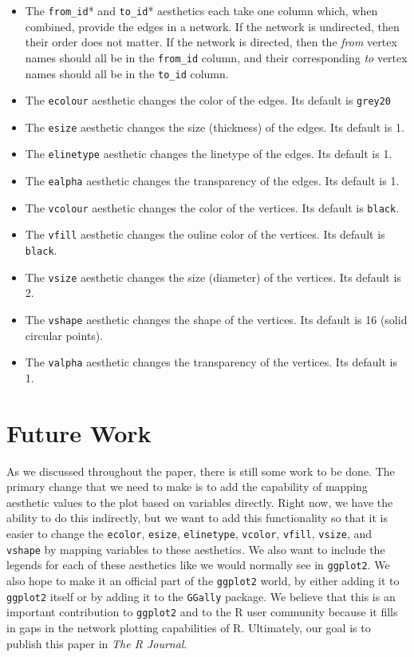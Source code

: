 \documentclass[11pt]{article}\usepackage[]{graphicx}\usepackage[]{color}
\begin{document}
  \begin{itemize}
  \item The \texttt{from\_id}* and \texttt{to\_id}* aesthetics each take one column which, when combined, provide the edges in a network.  If the network is undirected, then their order does not matter. If the network is directed, then the \emph{from} vertex names should all be in the \texttt{from\_id} column, and their corresponding \emph{to} vertex names should all be in the \texttt{to\_id} column.
  \item The \texttt{ecolour} aesthetic changes the color of the edges. Its default is \texttt{grey20}
  \item The \texttt{esize} aesthetic changes the size (thickness) of the edges. Its default is 1.
  \item The \texttt{elinetype} aesthetic changes the linetype of the edges. Its default is 1.
  \item The \texttt{ealpha} aesthetic changes the transparency of the edges. Its default is 1.
  \item The \texttt{vcolour} aesthetic changes the color of the vertices. Its default is \texttt{black}.
  \item The \texttt{vfill} aesthetic changes the ouline color of the vertices. Its default is \texttt{black}.
  \item The \texttt{vsize} aesthetic changes the size (diameter) of the vertices. Its default is 2.
  \item The \texttt{vshape} aesthetic changes the shape of the vertices. Its default is 16 (solid circular points).
  \item The \texttt{valpha} aesthetic changes the transparency of the vertices. Its default is 1.
  \end{itemize}

\section{Future Work}
As we discussed throughout the paper, there is still some work to be done.  The primary change that we need to make is to add the capability of mapping aesthetic values to the plot based on variables directly. Right now, we have the ability to do this indirectly, but we want to add this functionality so that it is easier to change the \texttt{ecolor}, \texttt{esize}, \texttt{elinetype}, \texttt{vcolor}, \texttt{vfill}, \texttt{vsize}, and \texttt{vshape} by mapping variables to these aesthetics.  We also want to include the legends for each of these aesthetics like we would normally see in \texttt{ggplot2}.   We also hope to make it an official part of the \texttt{ggplot2} world, by either adding it to \texttt{ggplot2} itself or by adding it to the \texttt{GGally} package.  We believe that this is an important contribution to \texttt{ggplot2} and to the R user community because it fills in gaps in the network plotting capabilities of R. Ultimately, our goal is to publish this paper in \textit{The R Journal}.



\end{document}
